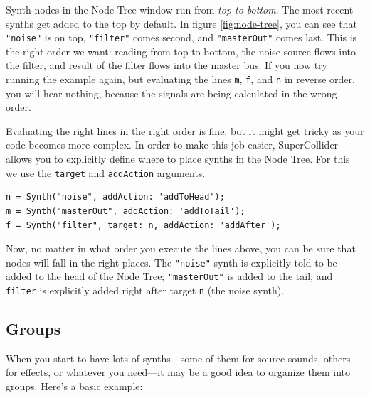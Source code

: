 Synth nodes in the Node Tree window run from \emph{top to bottom}. The most recent synths get added to the top by default. In figure \ref{fig:node-tree}, you can see that \texttt{"noise"} is on top, \texttt{"filter"} comes second, and \texttt{"masterOut"} comes last. This is the right order we want: reading from top to bottom, the noise source flows into the filter, and result of the filter flows into the master bus. If you now try running the example again, but evaluating the lines \texttt{m}, \texttt{f}, and \texttt{n} in reverse order, you will hear nothing, because the signals are being calculated in the wrong order.

Evaluating the right lines in the right order is fine, but it might get tricky as your code becomes more complex. In order to make this job easier, SuperCollider allows you to explicitly define where to place synths in the Node Tree. For this we use the \texttt{target} and \texttt{addAction} arguments.

\begin{lstlisting}[style=SuperCollider-IDE, basicstyle=\scttfamily\footnotesize]
n = Synth("noise", addAction: 'addToHead');
m = Synth("masterOut", addAction: 'addToTail');
f = Synth("filter", target: n, addAction: 'addAfter');
\end{lstlisting}
Now, no matter in what order you execute the lines above, you can be sure that nodes will fall in the right places. The \texttt{"noise"} synth is explicitly told to be added to the head of the Node Tree; \texttt{"masterOut"} is added to the tail; and \texttt{filter} is explicitly added right after target \texttt{n} (the noise synth).

\subsection{Groups}

When you start to have lots of synths---some of them for source sounds, others for effects, or whatever you need---it may be a good idea to organize them into groups. Here's a basic example:

